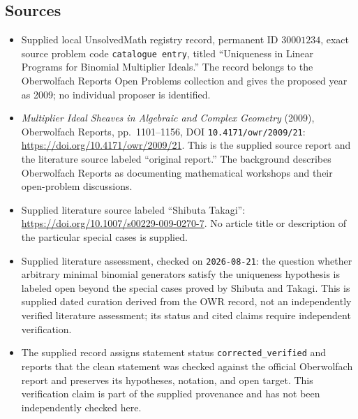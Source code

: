 \documentclass[11pt]{article}
\begin{document}
\subsection{Sources}
\begin{itemize}
\item Supplied local UnsolvedMath registry record, permanent ID \(30001234\), exact source problem code \texttt{catalogue entry}, titled ``Uniqueness in Linear Programs for Binomial Multiplier Ideals.'' The record belongs to the Oberwolfach Reports Open Problems collection and gives the proposed year as 2009; no individual proposer is identified.
\item \emph{Multiplier Ideal Sheaves in Algebraic and Complex Geometry} (2009), Oberwolfach Reports, pp.\ 1101--1156, DOI \texttt{10.4171/owr/2009/21}: \url{https://doi.org/10.4171/owr/2009/21}. This is the supplied source report and the literature source labeled ``original report.'' The background describes Oberwolfach Reports as documenting mathematical workshops and their open-problem discussions.
\item Supplied literature source labeled ``Shibuta Takagi'': \url{https://doi.org/10.1007/s00229-009-0270-7}. No article title or description of the particular special cases is supplied.
\item Supplied literature assessment, checked on \texttt{2026-08-21}: the question whether arbitrary minimal binomial generators satisfy the uniqueness hypothesis is labeled open beyond the special cases proved by Shibuta and Takagi. This is supplied dated curation derived from the OWR record, not an independently verified literature assessment; its status and cited claims require independent verification.
\item The supplied record assigns statement status \texttt{corrected\_verified} and reports that the clean statement was checked against the official Oberwolfach report and preserves its hypotheses, notation, and open target. This verification claim is part of the supplied provenance and has not been independently checked here.
\end{itemize}
\end{document}
